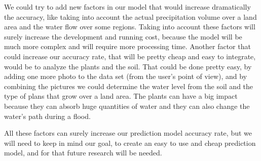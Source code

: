 \documentclass[12pt, a4paper]{report}
\begin{document}
We could try to add new factors in our model that would increase dramatically the accuracy, like taking into account the actual precipitation volume over a land area and the water flow over some regions. Taking into account these factors will surely increase the development and running cost, because the model will be much more complex and will require more processing time. Another factor that could increase our accuracy rate, that will be pretty cheap and easy to integrate, would be to analyze the plants and the soil. That could be done pretty easy, by adding one more photo to the data set (from the user's point of view), and by combining the pictures we could determine the water level from the soil and the type of plans that grow over a land area. The plants can have a big impact because they can absorb huge quantities of water and they can also change the water's path during a flood.
\par 
All these factors can surely increase our prediction model accuracy rate, but we will need to keep in mind our goal, to create an easy to use and cheap prediction model, and for that future research will be needed.




\renewcommand{\bibname}{Bibliography}

\end{document}
